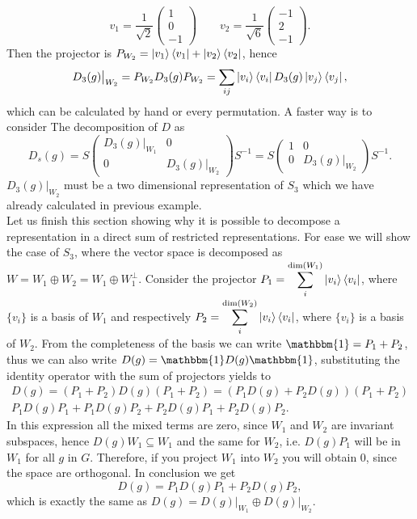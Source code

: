 \documentclass[12pt]{book}
\theoremstyle{plain}
\newcommand{\I}{\mathbbm{1}}
\theoremstyle{definition}
\theoremstyle{remark}
\begin{document}
\[v_1 = \frac{1}{\sqrt{2}}\begin{pmatrix}1\\0\\-1\end{pmatrix}\qquad v_2 = \frac{1}{\sqrt{6}}\begin{pmatrix}-1\\2\\-1\end{pmatrix}.\]
Then the projector is $P_{W_2} = \ket{v_1}\bra{v_1} + \ket{v_2}\bra{v_2}$, hence
\[D_3(g)\big|_{W_2} = P_{W_2}D_3(g)P_{W_2} = \sum_{ij} \ket{v_i}\bra{v_i}D_3(g)\ket{v_j}\bra{v_j},\]
which can be calculated by hand or every permutation. A faster way is to consider The decomposition of $D$ as
\[D_s(g) = S \begin{pmatrix}D_3(g)\big|_{W_1}&0\\0& D_3(g)\big|_{W_2} \end{pmatrix}S^{-1} =S \begin{pmatrix}1&0\\0& D_3(g)\big|_{W_2} \end{pmatrix}S^{-1}.\]
$D_3(g)\big|_{W_2} $ must be a two dimensional representation of $S_3$ which we have already calculated in previous example.\\
Let us finish this section showing why it is possible to decompose a representation in a direct sum of restricted representations. For ease we will show the case of $S_3$, where the vector space is decomposed as $W =W_1\oplus W_2 = W_1 \oplus W_1^\perp$. Consider the projector $P_1 = \displaystyle\sum_i ^{\text{dim}(W_1)}\ket{v_i}\bra{v_i}$, where $\{v_i\}$ is a basis of $W_1$ and respectively $P_2 = \displaystyle\sum_i ^{\text{dim}(W_2)}\ket{v_i}\bra{v_i}$, where $\{v_i\}$ is a basis of $W_2$. From the completeness of the basis we can write $\I = P_1 + P_2$, thus we can also write $D(g) = \I D(g) \I$, substituting the identity operator with the sum of projectors yields to
\begin{multline}
D(g) = (P
_1 + P_2)D(g)(P_1 + P_2) = (P_1D(g) + P_2D(g))(P_1 + P_2)\\ P_1D(g)P_1 +P_1D(g)P_2+P_2D(g)P_1+P_2D(g)P_2.
\end{multline}
In this expression all the mixed terms are zero, since $W_1$ and $W_2$ are invariant subspaces, hence $D(g)W_1 \subseteq W_1$ and the same for $W_2$, i.e. $D(g)P_1$ will be in $W_1$ for all $g$ in $G$. Therefore, if you project $W_1$ into $W_2$ you will obtain 0, since the space are orthogonal. In conclusion we get
\[D(g) =P_1D(g)P_1 + P_2D(g)P_2,\]
which is exactly the same as $D(g) = D(g)\big|_{W_1} \oplus  D(g)\big|_{W_2}$.
\end{document}
